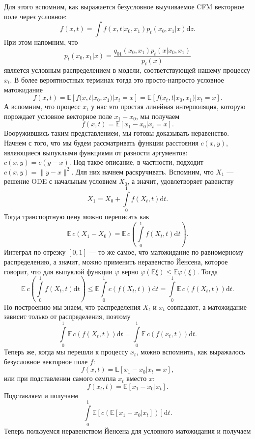 \documentclass[12pt]{article}
\theoremstyle{definition}
\begin{document}
Для этого вспомним, как выражается безусловное выучиваемое CFM векторное поле через условное:
\[
    f(x, t) = \int f(x, t | x_0, x_1) p_t(x_0, x_1 | x) \mathrm{d} z.
\]
При этом напомним, что 
\[
    p_t(x_0, x_1 | x) = \frac{q_{01}(x_0, x_1)p_t(x | x_0, x_1)}{p_t(x)}
\]
является условным распределением в модели, соответствующей нашему процессу $x_t$. В более вероятностных терминах тогда это просто-напросто условное матожидание
\[
    f(x, t) = \mathbb{E}\left[f(x, t | x_0, x_1) | x_t = x \right] = \mathbb{E}\left[f(x_t, t | x_0, x_1) | x_t = x\right].
\]
А вспомним, что процесс $x_t$ у нас это простая линейная интерполяция, которую порождает условное векторное поле $x_1 - x_0$, мы получаем
\[
    f(x, t) = \mathbb{E}\left[x_1 - x_0 | x_t = x \right].
\]
Вооружившись таким представлением, мы готовы доказывать неравенство. Начнем с того, что мы будем рассматривать функции расстояния $c(x, y)$, являющиеся выпуклыми функциями от разности аргументов: $c(x, y) = c(y - x)$. Под такое описание, в частности, подходит $c(x, y) = \|y - x\|^2$. Для них начнем раскручивать. Вспомним, что $X_1$ --- решение ODE с начальным условием $X_0$, а значит, удовлетворяет равенству
\[
    X_1 = X_0 + \int\limits_{0}^{1}f(X_t, t) \mathrm{d} t.
\]
Тогда транспортную цену можно переписать как
\[
    \mathbb{E}\, c(X_1 - X_0) = \mathbb{E} \, c\left(\int\limits_{0}^{1}f(X_t, t) \mathrm{d} t \right).
\]
Интеграл по отрезку $[0,1]$ --- то же самое, что матожидание по равномерному распределению, а значит, можно применить неравенство Йенсена, которое говорит, что для выпуклой функции $\varphi$ верно $\varphi(\mathbb{E} \xi) \leq \mathbb{E} \varphi(\xi)$. Тогда
\[
    \mathbb{E} \, c\left(\int\limits_{0}^{1}f(X_t, t) \mathrm{d} t \right) \leq \mathbb{E} \int\limits_{0}^{1} c\left(f(X_t, t)\right) \mathrm{d} t = \int\limits_{0}^{1}\mathbb{E}\, c\left(f(X_t, t)\right) \mathrm{d} t.
\]
По построению мы знаем, что распределения $X_t$ и $x_t$ совпадают, а матожидание зависит только от распределения, поэтому
\[
    \int\limits_{0}^{1}\mathbb{E}\, c\left(f(X_t, t)\right) \mathrm{d} t = \int\limits_{0}^{1}\mathbb{E}\, c\left(f(x_t, t)\right) \mathrm{d} t.
\]
Теперь же, когда мы перешли к процессу $x_t$, можно вспомнить, как выражалось безусловное векторное поле $f$:
\[
    f(x, t) = \mathbb{E}\left[x_1 - x_0 | x_t = x\right],
\]
или при подставлении самого семпла $x_t$ вместо $x$:
\[
    f(x_t, t) = \mathbb{E}\left[x_1 - x_0 | x_t\right].
\]
Подставляем и получаем
\[
    \int\limits_{0}^{1} \mathbb{E} \left[ c\left(\mathbb{E}\left[x_1 - x_0 | x_t \right] \right)\right] \mathrm{d} t.
\]
Теперь пользуемся неравенством Йенсена для условного матожидания и получаем
\end{document}
